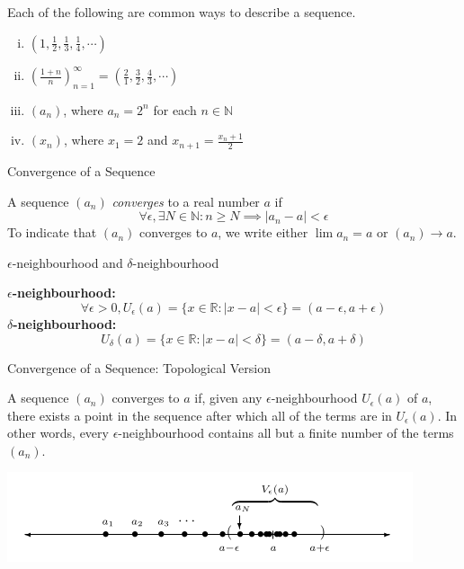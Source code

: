 \documentclass[12pt]{article}
\begin{document}
\begin{example}{Each of the following are common ways to describe a sequence}.

    \begin{enumerate}[(i)]
        \item $ \left( 1,\frac{1}{2},\frac{1}{3},\frac{1}{4},\cdots \right)  $
        \item $ \left( \frac{1+n}{n} \right)_{n=1}^{\infty} = \left( \frac{2}{1},\frac{3}{2},\frac{4}{3},\cdots \right)  $
       \item $(a_n)$, where  $a_n=2^n$ for each $n\in \mathbb{N}$
       \item $(x_n)$, where $x_1=2$ and $x_{n+1}=\frac{x_n+1}{2}$
    \end{enumerate}
\end{example}

\begin{definition}{Convergence of a Sequence}
    
    A sequence $(a_n)$ \textit{converges} to a real number $a$ if \[
        \forall\epsilon,\exists N\in\mathbb{N} : n \ge N \implies |a_n-a|<\epsilon
    \] To indicate that $(a_n)$ converges to $a$, we write either $\lim a_n=a $ or $(a_n) \to a$.
\end{definition}

\begin{definition}{$\epsilon$-neighbourhood and $\delta$-neighbourhood}
    
\textbf{$\epsilon$-neighbourhood:}
    \[ \forall \epsilon > 0, U_\epsilon (a) = \{ x\in\mathbb{R} : |x-a| < \epsilon \} = (a-\epsilon, a+\epsilon) \]
    \textbf{$\delta$-neighbourhood:}
    \[ U_\delta(a) = \{x \in \mathbb{R} : |x-a| < \delta \} = (a-\delta, a+\delta) \]

\end{definition}

\begin{definition}{Convergence of a Sequence: Topological Version}
    
    A sequence $(a_n)$ converges to $a$ if, given any $\epsilon$-neighbourhood $U_\epsilon(a)$ of $a$, there exists a point in the sequence after which all of the terms are in $U_\epsilon(a)$. In other words, every $\epsilon$-neighbourhood contains all but a finite number of the terms $(a_n)$.
\end{definition}
\begin{center}
    \includegraphics[scale=0.6]{Limit of a sequence Topological Version.png}
\end{center} 
\end{document}
